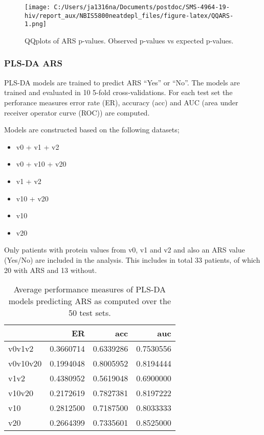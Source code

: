 \documentclass[
]{article}
\providecommand{\tightlist}{%
  \setlength{\itemsep}{0pt}\setlength{\parskip}{0pt}}
\begin{document}
\FloatBarrier

\begin{figure}
\centering
\texttt{[image: C:/Users/ja1316na/Documents/postdoc/SMS-4964-19-hiv/report\_aux/NBIS5800neatdepl\_files/figure-latex/QQARS-1.png]}
\caption{\label{fig:QQARS}QQplots of ARS p-values. Observed p-values vs expected p-values.}
\end{figure}

\hypertarget{pls-da-ars}{%
\subsubsection{PLS-DA ARS}\label{pls-da-ars}}

PLS-DA models are trained to predict ARS ``Yes'' or ``No''. The models are trained and evaluated in 10 5-fold cross-validations. For each test set the perforance measures error rate (ER), accuracy (acc) and AUC (area under receiver operator curve (ROC)) are computed.

Models are constructed based on the following datasets;

\begin{itemize}
\tightlist
\item
  v0 + v1 + v2
\item
  v0 + v10 + v20
\item
  v1 + v2
\item
  v10 + v20
\item
  v10
\item
  v20
\end{itemize}

Only patients with protein values from v0, v1 and v2 and also an ARS value (Yes/No) are included in the analysis. This includes in total 33 patients, of which 20 with ARS and 13 without.

\begin{table}

\caption{\label{tab:ARSperf}Average performance measures of PLS-DA models predicting ARS as computed over the 50 test sets.}
\centering
\begin{tabular}[t]{l|r|r|r}
\hline
  & ER & acc & auc\\
\hline
v0v1v2 & 0.3660714 & 0.6339286 & 0.7530556\\
\hline
v0v10v20 & 0.1994048 & 0.8005952 & 0.8194444\\
\hline
v1v2 & 0.4380952 & 0.5619048 & 0.6900000\\
\hline
v10v20 & 0.2172619 & 0.7827381 & 0.8197222\\
\hline
v10 & 0.2812500 & 0.7187500 & 0.8033333\\
\hline
v20 & 0.2664399 & 0.7335601 & 0.8525000\\
\hline
\end{tabular}
\end{table}
\end{document}
